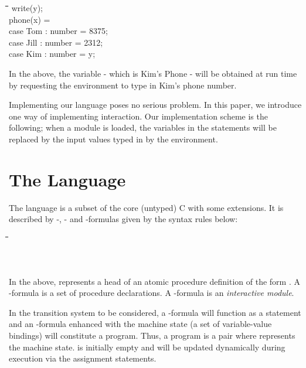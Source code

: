 \documentclass[12pt]{article}
\newenvironment{exmple}{
 \begingroup \begin{tabbing} \hspace{2em}\= \hspace{3em}\= \hspace{3em}\=
\hspace{3em}\= \hspace{3em}\= \hspace{3em}\= \kill}{
 \end{tabbing}\endgroup}
\newenvironment{example}{
\begingroup  \begin{tabbing} \hspace{2em}\= \hspace{3em}\= \hspace{3em}\=
\hspace{3em}\= \hspace{3em}\= \hspace{3em}\= \hspace{3em}\= \hspace{3em}\= 
\hspace{3em}\= \hspace{3em}\= \hspace{3em}\= \hspace{3em}\= \kill}{
 \end{tabbing} \endgroup }
\begin{document}
\begin{example}
	write(y); \\
	phone(x) = 		\\
	\>	case Tom : number = 8375;\\
	\>	case Jill : number = 2312;\\
	\>	case Kim : number = y;
\end{example}

In the above, the variable   - which is Kim's Phone - will be obtained at run time by
requesting the environment to type in Kim's phone number.


Implementing our language poses no serious problem.
 In this paper, we introduce one 
 way of implementing interaction.
Our implementation scheme is the following; when a module is loaded, the variables in the 
statements   will be replaced by the input values typed in by the environment.


\section{The Language}\label{sec:logic}

The language is a subset of the core (untyped) C
 with some extensions. It is described
by -, - and -formulas given by the syntax rules below:
\begin{exmple}
\> \>    \\  
\> \>  \\
\> \>  \\
\end{exmple}
\noindent
 In the above, 
  represents a head of an atomic procedure definition of the form . 
A -formula is a set
of procedure declarations. A -formula is an {\it interactive module}.

In the transition system to be considered, a -formula will function as a statement 
and an   -formula  enhanced with the
machine state (a set of variable-value bindings) will constitute  a program.
Thus, a program is a pair   
where   represents the machine state.
 is initially  empty  and will be updated dynamically during execution
via the assignment statements. 
\end{document}
